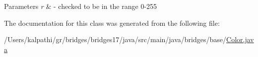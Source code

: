 \begin{DoxyParams}{Parameters}
{\em r} & -\/ checked to be in the range 0-\/255 \\
\hline
\end{DoxyParams}


The documentation for this class was generated from the following file\+:\begin{DoxyCompactItemize}
\item 
/\+Users/kalpathi/gr/bridges/bridges17/java/src/main/java/bridges/base/\hyperlink{_color_8java}{Color.\+java}\end{DoxyCompactItemize}

